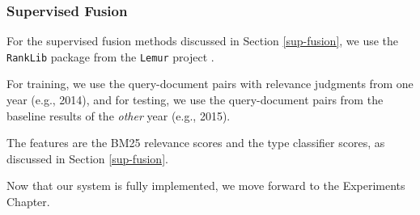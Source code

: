 \subsubsection{Supervised Fusion}\label{impl-sup}
For the supervised fusion methods discussed in Section \ref{sup-fusion},
we use the \texttt{RankLib} package from the \texttt{Lemur} project \cite{ranklib}.

For training, we use the query-document pairs with relevance judgments from one year (e.g., 2014),
and for testing, we use the query-document pairs from the baseline results of the \emph{other} year (e.g., 2015).

The features are the BM25 relevance scores and the type classifier scores, as discussed in Section \ref{sup-fusion}.

Now that our system is fully implemented, we move forward to the Experiments Chapter.




